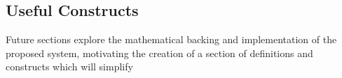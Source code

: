 \subsection{Useful Constructs}

Future sections explore the mathematical backing and implementation of the proposed system, motivating the creation of a section of definitions and constructs which will simplify 